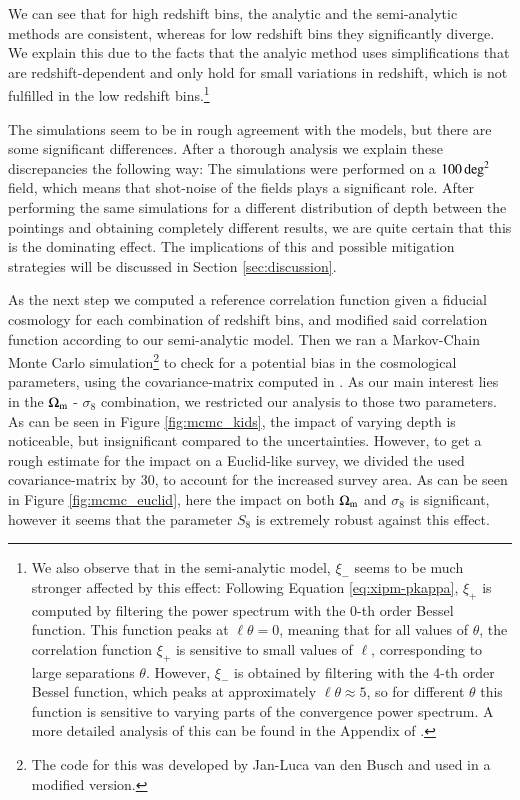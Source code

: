 We can see that for high redshift bins, the analytic and the semi-analytic methods are consistent, whereas for low redshift bins they significantly diverge. We explain this due to the facts that the analyic method uses simplifications that are redshift-dependent and only hold for small variations in redshift, which is not fulfilled in the low redshift bins.\footnote{We also observe that in the semi-analytic model, $\xi_-$ seems to be much stronger affected by this effect: Following Equation \eqref{eq:xipm-pkappa}, $\xi_+$ is computed by filtering the power spectrum with the 0-th order Bessel function. This function peaks at $\ell\theta=0$, meaning that for all values of $\theta$, the correlation function $\xi_+$ is sensitive to small values of $\ell$, corresponding to large separations $\theta$. However, $\xi_-$ is obtained by filtering with the 4-th order Bessel function, which peaks at approximately $\ell\theta\approx 5$, so for different $\theta$ this function is sensitive to varying parts of the convergence power spectrum. A more detailed analysis of this can be found in the Appendix of \citet{2017MNRAS.471.4412K}.}

The simulations seem to be in rough agreement with the models, but there are some significant differences. After a thorough analysis we explain these discrepancies the following way: The simulations were performed on a $100\,\rm{deg}^2$ field, which means that shot-noise of the fields plays a significant role. After performing the same simulations for a different distribution of depth between the pointings and obtaining completely different results, we are quite certain that this is the dominating effect. The implications of this and possible mitigation strategies will be discussed in Section \ref{sec:discussion}.


As the next step we computed a reference correlation function given a fiducial cosmology for each combination of redshift bins, and modified said correlation function according to our semi-analytic model. Then we ran a Markov-Chain Monte Carlo simulation\footnote{The code for this was developed by Jan-Luca van den Busch and used in a modified version.} to check for a potential bias in the cosmological parameters, using the covariance-matrix computed in \citet{2017MNRAS.465.1454H}. As our main interest lies in the $\Omega_{\rm m}$ - $\sigma_8$ combination, we restricted our analysis to those two parameters. As can be seen in Figure \ref{fig:mcmc_kids}, the impact of varying depth is noticeable, but insignificant compared to the uncertainties. However, to get a rough estimate for the impact on a Euclid-like survey, we divided the used covariance-matrix by 30, to account for the increased survey area. As can be seen in Figure \ref{fig:mcmc_euclid}, here the impact on both $\Omega_{\rm m}$ and $\sigma_8$ is significant, however it seems that the parameter $S_8$ is extremely robust against this effect.

